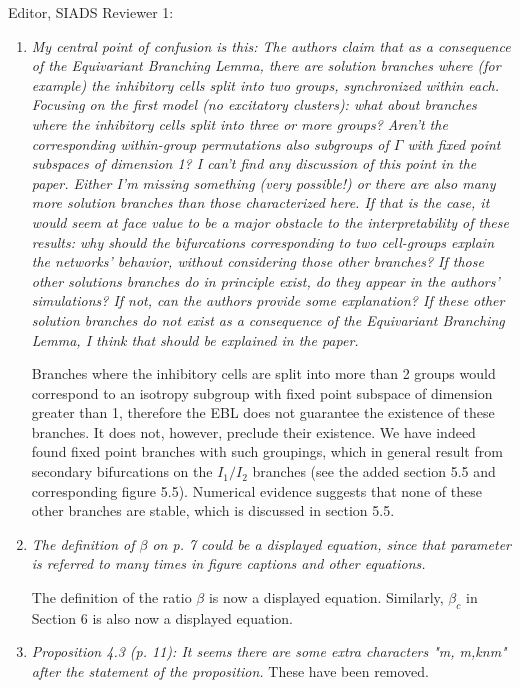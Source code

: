 \documentclass[11pt]{letter}
\begin{document}
\begin{letter}{Editor, SIADS}
Reviewer 1: 
\begin{enumerate}
\item \emph{My central point of confusion is this: The authors claim that as a consequence of the Equivariant Branching Lemma, there are solution branches where (for example) the inhibitory cells split into two groups, synchronized within each. Focusing on the first model (no excitatory clusters): what about branches where the inhibitory cells split into three or more groups? Aren't the corresponding within-group permutations also subgroups of $\Gamma$ with fixed point subspaces of dimension 1? I can't find any discussion of this point in the paper. Either I'm missing something (very possible!) or there are also many more solution branches than those characterized here. If that is the case, it would seem at face value to be a major obstacle to the interpretability of these results: why should the bifurcations corresponding to two cell-groups explain the networks' behavior, without considering those other branches? If those other solutions branches do in principle exist, do they appear in the authors' simulations? If not, can the authors provide some explanation? If these other solution branches do not exist as a consequence of the Equivariant Branching Lemma, I think that should be explained in the paper.} 

\vspace{4mm}
Branches where the inhibitory cells are split into more than 2 groups would correspond to an isotropy subgroup with fixed point subspace of dimension greater than 1, therefore the EBL does not guarantee the existence of these branches. It does not, however, preclude their existence. We have indeed found fixed point branches with such groupings, which in general result from secondary bifurcations on the $I_1/I_2$ branches (see the added section 5.5 and corresponding figure 5.5). Numerical evidence suggests that none of these other branches are stable, which is discussed in section 5.5.

\item \emph{The definition of $\beta$ on p. 7 could be a displayed equation, since that parameter is referred to many times in figure captions and other equations. }

\vspace{4mm}
The definition of the ratio $\beta$ is now a displayed equation. Similarly, $\beta_c$ in Section 6 is also now a displayed equation.


\item \emph{Proposition 4.3 (p. 11): It seems there are some extra characters "m, m,knm" after the statement of the proposition. }
These have been removed.
\vspace{4mm} 


\end{enumerate}
\end{letter}
\end{document}
